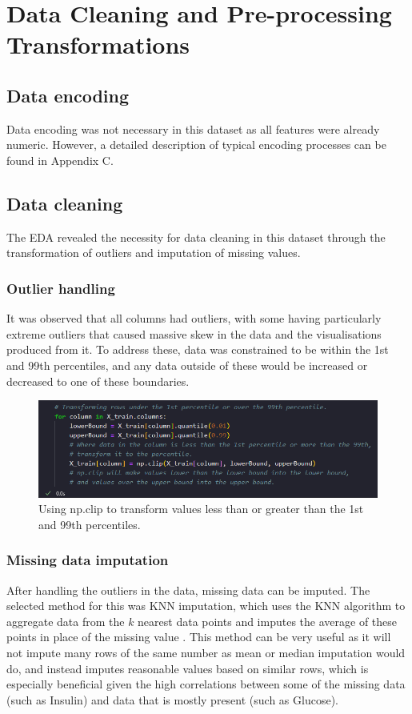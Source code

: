 \documentclass[12pt]{report}
\begin{document}
\section{Data Cleaning and Pre-processing Transformations}\label{sec:Preprocessing}
\subsection{Data encoding}
Data encoding was not necessary in this dataset as all features were already numeric. However, a detailed description of typical 
encoding processes can be found in Appendix C.

\subsection{Data cleaning}
The EDA revealed the necessity for data cleaning in this dataset through the transformation of outliers and imputation of missing values.

\subsubsection{Outlier handling}
It was observed that all columns had outliers, with some having particularly extreme outliers that caused massive skew in the data and 
the visualisations produced from it. To address these, data was constrained to be within the 1st and 99th percentiles, and any data outside 
of these would be increased or decreased to one of these boundaries.

\begin{figure}[H]
    \centering
    \includegraphics[width=\linewidth]{Preprocessing/OutlierConstraining.png}
    \caption{Using np.clip to transform values less than or greater than the 1st and 99th percentiles.}
    \label{fig:OutlierConstraining}
\end{figure}

\pagebreak 

\subsubsection{Missing data imputation}
After handling the outliers in the data, missing data can be imputed. The selected method for this was KNN imputation,
which uses the KNN algorithm to aggregate data from the $k$ nearest data points and imputes the average of these points 
in place of the missing value \autocite{trainindata_knn_2024}. This method can be very useful as it will not impute many rows 
of the same number as mean or median imputation would do, and instead imputes reasonable values based on similar rows,
which is especially beneficial given the high correlations between some of the missing data (such as Insulin) and data 
that is mostly present (such as Glucose).
\end{document}
